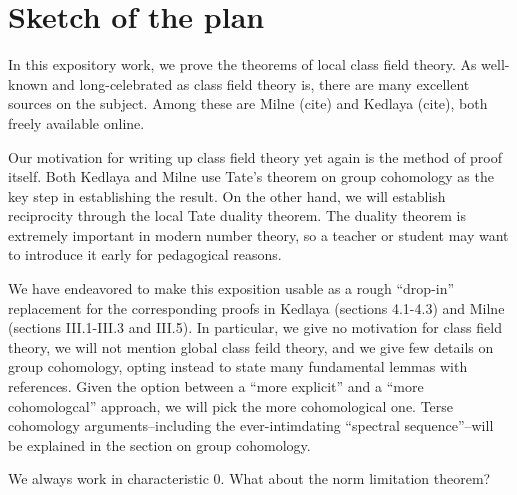 
\section{Sketch of the plan}


In this expository work, we prove the theorems of 
local class field theory. 
As well-known and long-celebrated as class field theory is, 
there are many excellent sources on the subject. 
Among these are Milne (cite) and Kedlaya (cite), both freely
available online. 

Our motivation for writing up class field theory yet again 
is the method
of proof itself. 
Both Kedlaya and Milne use Tate's theorem on group cohomology
as the key step in establishing the result. 
On the other hand, we will establish reciprocity through
the local Tate duality theorem.
The duality theorem is extremely important in modern number
theory, so a teacher or student 
may want to introduce it early for pedagogical reasons.

We have endeavored to make this exposition usable as a 
rough
``drop-in'' replacement for the corresponding proofs 
in Kedlaya (sections 4.1-4.3) and 
Milne (sections III.1-III.3 and III.5).
In particular, we give no motivation for class field 
theory, we will not mention global class feild theory,
and we give few details on group cohomology,
opting instead to state many fundamental lemmas with references.
Given the option between a ``more explicit'' and a
``more cohomologcal'' approach, we will pick the
more cohomological one.
Terse cohomology arguments--including the ever-intimdating
``spectral sequence''--will be explained in the section on
group cohomology.

We always work in characteristic 0.
What about the norm limitation theorem?


